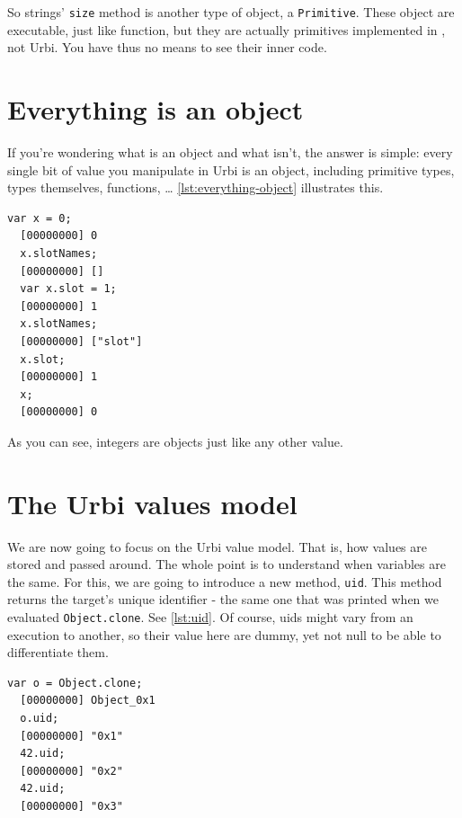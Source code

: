 \documentclass[openright,twoside,12pt]{report}
\newcommand{\urbi}{Urbi\xspace}
\newcommand{\lst}[1]{\autoref{lst:#1}}
\begin{document}
So strings' \texttt{size} method is another type of object, a
\texttt{Primitive}. These object are executable, just like function,
but they are actually primitives implemented in \Cxx, not \urbi. You
have thus no means to see their inner code.

\section{Everything is an object}

If you're wondering what is an object and what isn't, the answer is
simple: every single bit of value you manipulate in \urbi is an
object, including primitive types, types themselves, functions, \ldots
\lst{everything-object} illustrates this.

\begin{lstlisting}[caption=Everything is an object,
  label=lst:everything-object]
  var x = 0;
  [00000000] 0
  x.slotNames;
  [00000000] []
  var x.slot = 1;
  [00000000] 1
  x.slotNames;
  [00000000] ["slot"]
  x.slot;
  [00000000] 1
  x;
  [00000000] 0
\end{lstlisting}

As you can see, integers are objects just like any other value.

\section{The \urbi values model}

We are now going to focus on the \urbi value model. That is, how
values are stored and passed around. The whole point is to understand
when variables are the same. For this, we are going to introduce a new
method, \texttt{uid}. This method returns the target's unique
identifier - the same one that was printed when we evaluated
\lstinline|Object.clone|. See \lst{uid}. Of course, uids might vary
from an execution to another, so their value here are dummy, yet not
null to be able to differentiate them.

\begin{lstlisting}[caption=Uids, label=lst:uid]
  var o = Object.clone;
  [00000000] Object_0x1
  o.uid;
  [00000000] "0x1"
  42.uid;
  [00000000] "0x2"
  42.uid;
  [00000000] "0x3"
\end{lstlisting}
\end{document}
